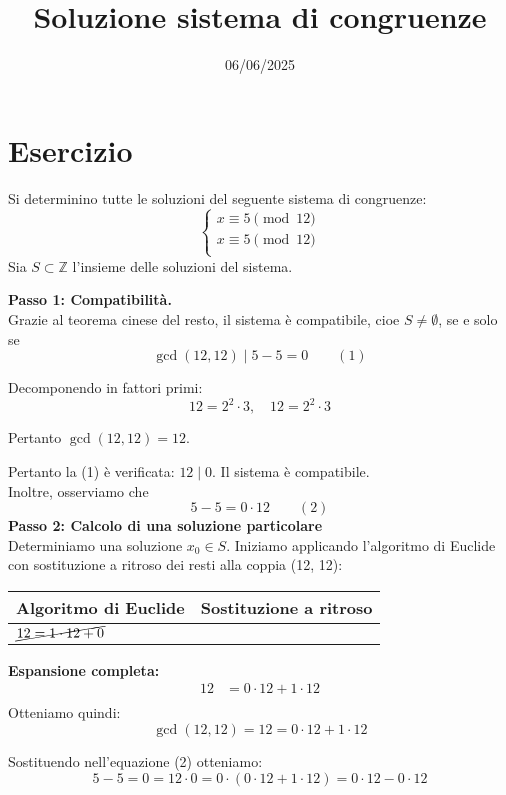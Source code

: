 \documentclass[12pt]{article}
\begin{document}
\title{Soluzione sistema di congruenze}
\date{06/06/2025}
\maketitle
\section*{Esercizio}
Si determinino tutte le soluzioni del seguente sistema di congruenze:
\[
\begin{cases}
x \equiv 5 \pmod{12} \\
x \equiv 5 \pmod{12} \\
\end{cases}
\]
Sia $S \subset \mathbb{Z}$ l'insieme delle soluzioni del sistema.

\textbf{Passo 1: Compatibilità.} \\ 
Grazie al teorema cinese del resto, il sistema è compatibile, cioe $S \neq \emptyset$, se e solo se
$$\gcd(12, 12) \mid 5 - 5 = 0 \qquad (1)$$

Decomponendo in fattori primi:
$$12 = 2^{2} \cdot 3, \quad 12 = 2^{2} \cdot 3$$

Pertanto $\gcd(12, 12) = 12$.

Pertanto la (1) è verificata: $12 \mid 0$. Il sistema è compatibile.\\
Inoltre, osserviamo che $$5 - 5 = 0 \cdot 12 \qquad (2)$$
\textbf{Passo 2: Calcolo di una soluzione particolare} \\
Determiniamo una soluzione $x_0 \in S$.
Iniziamo applicando l'algoritmo di Euclide con sostituzione a ritroso dei resti alla coppia (12, 12):
\begin{center}
\setlength{\arrayrulewidth}{0.5pt}
\begin{tabular}{|p{5cm}|p{9cm}|}
\hline
\textbf{Algoritmo di Euclide} & \textbf{Sostituzione a ritroso} \\
\hline
$\cancel{12 = 1 \cdot  12 + 0}$ & \\
\hline
\end{tabular}
\end{center}
\textbf{Espansione completa:}
\begin{align*}
12 &= 0\cdot12 + 1\cdot12\\
\end{align*}
Otteniamo quindi: $$\gcd(12, 12) = 12 = 0 \cdot 12 + 1 \cdot 12$$

Sostituendo nell'equazione (2) otteniamo:
$$5 - 5 = 0 = 12 \cdot 0 = 0 \cdot (0 \cdot 12 + 1 \cdot 12) = 0 \cdot 12 - 0 \cdot 12$$
\end{document}
